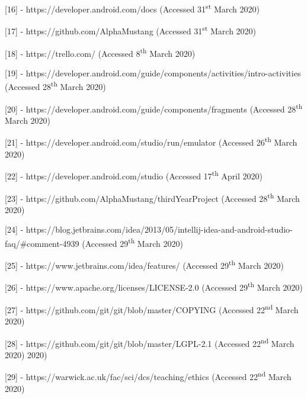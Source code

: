 \documentclass{article}
\begin{document}
[16] - https://developer.android.com/docs (Accessed 31\textsuperscript{st} March 2020) \par

[17] - https://github.com/AlphaMustang (Accessed 31\textsuperscript{st} March 2020) \par

[18] - https://trello.com/ (Accessed 8\textsuperscript{th} March 2020) \par

[19] - https://developer.android.com/guide/components/activities/intro-activities (Accessed 28\textsuperscript{th} March 2020) \par

[20] - https://developer.android.com/guide/components/fragments (Accessed 28\textsuperscript{th} March 2020) \par

[21] - https://developer.android.com/studio/run/emulator (Accessed 26\textsuperscript{th} March 2020) \par

[22] - https://developer.android.com/studio (Accessed 17\textsuperscript{th} April 2020) \par

[23] - https://github.com/AlphaMustang/thirdYearProject (Accessed 28\textsuperscript{th} March 2020) \par

[24] - https://blog.jetbrains.com/idea/2013/05/intellij-idea-and-android-studio-faq/\#comment-4939 (Accessed 29\textsuperscript{th} March 2020) \par

[25] - https://www.jetbrains.com/idea/features/ (Accessed 29\textsuperscript{th} March 2020) \par

[26] - https://www.apache.org/licenses/LICENSE-2.0 (Accessed 29\textsuperscript{th} March 2020) \par

[27] - https://github.com/git/git/blob/master/COPYING (Accessed 22\textsuperscript{nd} March 2020) \par

[28] - https://github.com/git/git/blob/master/LGPL-2.1 (Accessed 22\textsuperscript{nd} March 2020) 2020) \par

[29] - https://warwick.ac.uk/fac/sci/dcs/teaching/ethics (Accessed 22\textsuperscript{nd} March 2020) \par
\end{document}
